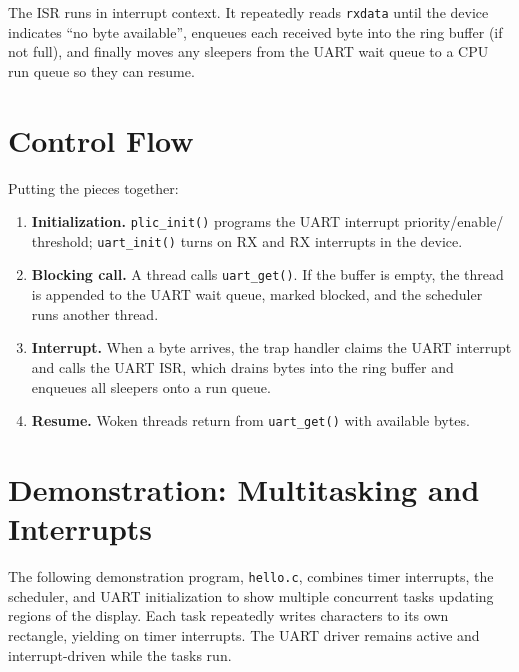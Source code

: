 The ISR runs in interrupt context. It repeatedly reads \texttt{rxdata} until the device indicates
“no byte available”, enqueues each received byte into the ring buffer (if not full), and finally
moves any sleepers from the UART wait queue to a CPU run queue so they can resume.





\section{Control Flow}

Putting the pieces together:
\begin{enumerate}
  \item \textbf{Initialization.} \texttt{plic\_init()} programs the UART interrupt priority/enable/
        threshold; \texttt{uart\_init()} turns on RX and RX interrupts in the device.
  \item \textbf{Blocking call.} A thread calls \texttt{uart\_get()}. If the buffer is empty, the
        thread is appended to the UART wait queue, marked blocked, and the scheduler runs another
        thread.
  \item \textbf{Interrupt.} When a byte arrives, the trap handler claims the UART interrupt and
        calls the UART ISR, which drains bytes into the ring buffer and enqueues all sleepers onto
        a run queue.
  \item \textbf{Resume.} Woken threads return from \texttt{uart\_get()} with available bytes.
\end{enumerate}

\section{Demonstration: Multitasking and Interrupts}

The following demonstration program, \texttt{hello.c}, combines timer interrupts, the scheduler,
and UART initialization to show multiple concurrent tasks updating regions of the display.
Each task repeatedly writes characters to its own rectangle, yielding on timer interrupts.
The UART driver remains active and interrupt-driven while the tasks run.

